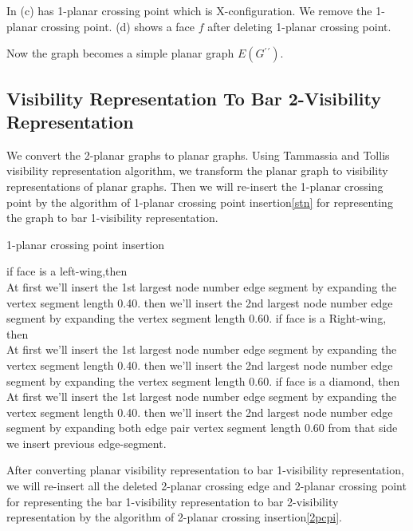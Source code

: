 In (c) has 1-planar crossing point which is X-configuration. We remove the 1-planar crossing point. (d) shows a face $f$ after deleting 1-planar crossing point.


Now the graph becomes a simple planar graph $E(G{^\prime}{^\prime})$. 



\subsection{Visibility Representation To Bar 2-Visibility Representation}
We convert the 2-planar graphs to planar graphs. Using Tammassia and Tollis \cite{R} visibility representation algorithm, we transform the planar graph to visibility representations of planar graphs. Then we will re-insert the 1-planar crossing point by the algorithm of 1-planar crossing point insertion\ref{stn} for representing the graph to bar 1-visibility representation.



\begin{algorithm}[H] 
\caption{1-planar crossing point insertion}
\label{1cpca}

\begin{algorithmic}[1]
\STATE if face is a left-wing,then\\
{At first we'll insert the 1st largest node number edge segment  by expanding the vertex segment length 0.40.
then  we'll insert the 2nd largest node number edge segment  by expanding the vertex segment length 0.60.}
\STATE 
if face is a Right-wing, 
then\\
{At first we'll insert the 1st largest node number edge segment  by expanding the vertex segment length 0.40.
then  we'll insert the 2nd largest node number edge segment  by expanding the vertex segment length 0.60.}
\STATE 
if face is a diamond, then
 \\
{ At first we'll insert the 1st largest node number edge segment  by expanding the vertex segment length 0.40.
then  we'll insert the 2nd largest node number edge segment  by expanding both edge pair vertex segment length 0.60 from that side we insert previous edge-segment.}
\end{algorithmic}
\end{algorithm}

After converting planar visibility representation to bar 1-visibility representation, we will re-insert all the deleted 2-planar crossing edge and 2-planar crossing point for representing the bar 1-visibility representation to bar 2-visibility representation by the algorithm of 2-planar crossing insertion\ref{2pcpi}. 



